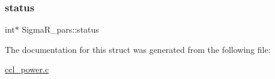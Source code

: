 \subsubsection{\texorpdfstring{status}{status}}
{\footnotesize\ttfamily int$\ast$ Sigma\+R\+\_\+pars\+::status}



The documentation for this struct was generated from the following file\+:\begin{DoxyCompactItemize}
\item 
\mbox{\hyperlink{ccl__power_8c}{ccl\+\_\+power.\+c}}\end{DoxyCompactItemize}
